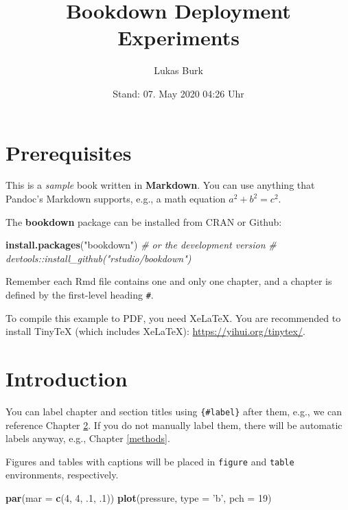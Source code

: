 \documentclass[ngerman,a4paper,]{scrartcl}
\title{Bookdown Deployment Experiments}
\author{Lukas Burk}
\date{Stand: 07. May 2020 04:26 Uhr}
\newenvironment{Shaded}{\begin{snugshade}}{\end{snugshade}}
\newcommand{\CommentTok}[1]{\textcolor[rgb]{0.56,0.35,0.01}{\textit{#1}}}
\newcommand{\DataTypeTok}[1]{\textcolor[rgb]{0.13,0.29,0.53}{#1}}
\newcommand{\DecValTok}[1]{\textcolor[rgb]{0.00,0.00,0.81}{#1}}
\newcommand{\FloatTok}[1]{\textcolor[rgb]{0.00,0.00,0.81}{#1}}
\newcommand{\KeywordTok}[1]{\textcolor[rgb]{0.13,0.29,0.53}{\textbf{#1}}}
\newcommand{\NormalTok}[1]{#1}
\newcommand{\StringTok}[1]{\textcolor[rgb]{0.31,0.60,0.02}{#1}}
\begin{document}
\maketitle

{
\hypersetup{linkcolor=}
\setcounter{tocdepth}{2}
\tableofcontents
}
\hypertarget{prerequisites}{%
\section{Prerequisites}\label{prerequisites}}

This is a \emph{sample} book written in \textbf{Markdown}. You can use anything that Pandoc's Markdown supports, e.g., a math equation \(a^2 + b^2 = c^2\).

The \textbf{bookdown} package can be installed from CRAN or Github:

\begin{Shaded}
\begin{Highlighting}[]
\KeywordTok{install.packages}\NormalTok{(}\StringTok{"bookdown"}\NormalTok{)}
\CommentTok{# or the development version}
\CommentTok{# devtools::install_github("rstudio/bookdown")}
\end{Highlighting}
\end{Shaded}

Remember each Rmd file contains one and only one chapter, and a chapter is defined by the first-level heading \texttt{\#}.

To compile this example to PDF, you need XeLaTeX. You are recommended to install TinyTeX (which includes XeLaTeX): \url{https://yihui.org/tinytex/}.

\hypertarget{intro}{%
\section{Introduction}\label{intro}}

You can label chapter and section titles using \texttt{\{\#label\}} after them, e.g., we can reference Chapter \ref{intro}. If you do not manually label them, there will be automatic labels anyway, e.g., Chapter \ref{methods}.

Figures and tables with captions will be placed in \texttt{figure} and \texttt{table} environments, respectively.

\begin{Shaded}
\begin{Highlighting}[]
\KeywordTok{par}\NormalTok{(}\DataTypeTok{mar =} \KeywordTok{c}\NormalTok{(}\DecValTok{4}\NormalTok{, }\DecValTok{4}\NormalTok{, }\FloatTok{.1}\NormalTok{, }\FloatTok{.1}\NormalTok{))}
\KeywordTok{plot}\NormalTok{(pressure, }\DataTypeTok{type =} \StringTok{'b'}\NormalTok{, }\DataTypeTok{pch =} \DecValTok{19}\NormalTok{)}
\end{Highlighting}
\end{Shaded}
\end{document}
